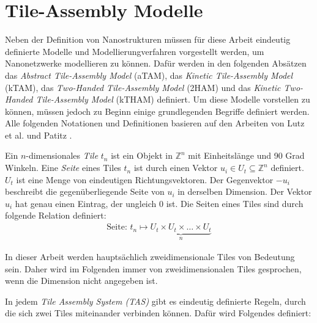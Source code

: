 \section{Tile-Assembly Modelle}
Neben der Definition von Nanostrukturen müssen für diese Arbeit eindeutig definierte Modelle und Modellierungverfahren vorgestellt werden, um Nanonetzwerke modellieren zu können.
Dafür werden in den folgenden Absätzen das \emph{Abstract Tile-Assembly Model} (aTAM), das \emph{Kinetic Tile-Assembly Model} (kTAM), das \emph{Two-Handed Tile-Assembly Model} (2HAM) und das \emph{Kinetic Two-Handed Tile-Assembly Model} (kTHAM) definiert. Um diese Modelle vorstellen zu können, müssen jedoch zu Beginn einige grundlegenden Begriffe definiert werden. Alle folgenden Notationen und Definitionen basieren auf den Arbeiten von Lutz et al. \cite{lathrop2009strict} und Patitz \cite{patitz2014introduction}.

\begin{definition}
	Ein $n$-dimensionales \emph{Tile} $t_n$ ist ein Objekt in $\mathbb{Z}^n$ mit Einheitslänge und 90 Grad Winkeln. 
	Eine \emph{Seite} eines Tiles $t_n$ ist durch einen Vektor $u_i \in U_t \subseteq \mathbb{Z}^n$ definiert. $U_t$ ist eine Menge von eindeutigen Richtungsvektoren. 
	Der Gegenvektor $-u_i$ beschreibt die gegenüberliegende Seite von $u_i$ in derselben Dimension. Der Vektor $u_i$ hat genau einen Eintrag, der ungleich $0$ ist. Die Seiten eines Tiles sind durch folgende Relation definiert:
	\begin{align*}
		\text{Seite: }t_n \mapsto \underbrace{U_t\times U_t\times \dots\times U_t}_n
	\end{align*} 
\end{definition}

In dieser Arbeit werden hauptsächlich zweidimensionale Tiles von Bedeutung sein. Daher wird im Folgenden immer von zweidimensionalen Tiles gesprochen, wenn die Dimension nicht angegeben ist.

In jedem \emph{Tile Assembly System (TAS)} gibt es eindeutig definierte Regeln, durch die sich zwei Tiles miteinander verbinden können. Dafür wird Folgendes definiert:

